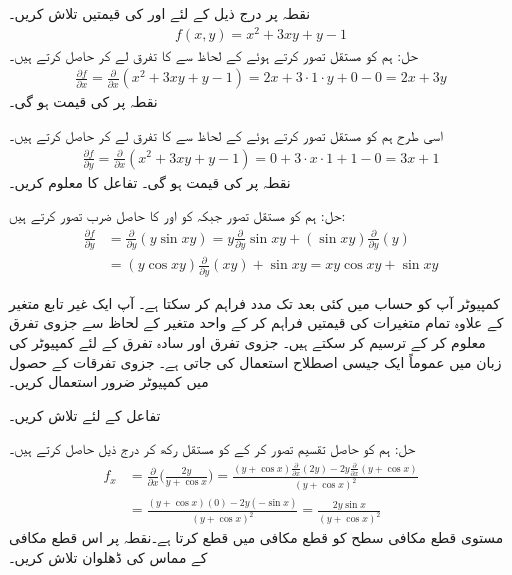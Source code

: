 نقطہ  پر درج ذیل کے لئے  اور  کی قیمتیں تلاش کریں۔
\begin{align*}
f(x,y)=x^2+3xy+y-1
\end{align*}
حل:\quad
ہم  کو مستقل تصور کرتے ہوئے  کے لحاظ سے  کا تفرق لے کر    حاصل کرتے ہیں۔
\begin{align*}
\frac{\partial f}{\partial x}=\frac{\partial}{\partial x}(x^2+3xy+y-1)=2x+3\cdot 1\cdot y+0-0=2x+3y
\end{align*}
نقطہ  پر  کی قیمت  ہو گی۔

اسی طرح ہم  کو مستقل تصور کرتے ہوئے  کے لحاظ سے  کا تفرق لے کر    حاصل کرتے ہیں۔
\begin{align*}
\frac{\partial f}{\partial y}=\frac{\partial}{\partial x}(x^2+3xy+y-1)=0+3\cdot x\cdot 1+1-0=3x+1
\end{align*}
نقطہ  پر  کی قیمت  ہو گی۔
تفاعل  کا  معلوم کریں۔

حل:\quad
ہم  کو مستقل  تصور جبکہ   کو  اور  کا حاصل ضرب تصور کرتے ہیں:
\begin{align*}
\frac{\partial f}{\partial y}&=\frac{\partial}{\partial y}(y\sin xy)=y\frac{\partial}{\partial y}\sin xy+(\sin xy)\frac{\partial}{\partial y}(y)\\
&=(y\cos xy)\frac{\partial}{\partial y}(xy) +\sin xy=xy\cos xy+\sin xy
\end{align*}

\quad کمپیوٹر آپ کو حساب میں کئی بعد  تک مدد فراہم کر سکتا ہے۔ آپ ایک غیر تابع متغیر کے علاوہ تمام متغیرات کی قیمتیں فراہم کر کے واحد  متغیر کے لحاظ سے جزوی تفرق معلوم کر  کے  ترسیم کر سکتے ہیں۔ جزوی تفرق اور سادہ تفرق کے لئے کمپیوٹر کی زبان میں عموماً  ایک جیسی اصطلاح استعمال کی جاتی ہے۔  جزوی تفرقات کے حصول میں کمپیوٹر ضرور استعمال کریں۔

تفاعل  کے لئے  تلاش کریں۔

حل:\quad
ہم  کو حاصل تقسیم تصور کر کے  کو مستقل رکھ کر درج ذیل حاصل کرتے ہیں۔
\begin{align*}
f_x&=\frac{\partial}{\partial x}\big(\frac{2y}{y+\cos x}\big)=\frac{(y+\cos x)\tfrac{\partial}{\partial x}(2y)-2y\tfrac{\partial}{\partial x}(y+\cos x)}{(y+\cos x)^2}\\
&=\frac{(y+\cos x)(0)-2y(-\sin x)}{(y+\cos x)^2}=\frac{2y\sin x}{(y+\cos x)^2}
\end{align*}
مستوی  قطع مکافی سطح   کو قطع مکافی میں قطع کرتا ہے۔نقطہ  پر اس قطع مکافی کے مماس کی ڈھلوان تلاش کریں۔

